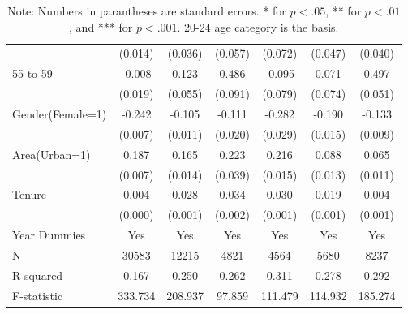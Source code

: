 \documentclass[12pt,author-year]{article}
\begin{document}
\begin{table}[H]
{{\begin{tabular}{l*{6}{c}}
&  (0.014)         &  (0.036)         &  (0.057)         &  (0.072)         &  (0.047)         &  (0.040)         \\
55 to 59            &   -0.008         &    0.123\sym{*}  &    0.486\sym{***}&   -0.095         &    0.071         &    0.497\sym{***}\\
&  (0.019)         &  (0.055)         &  (0.091)         &  (0.079)         &  (0.074)         &  (0.051)         \\
				Gender(Female=1)       &   -0.242\sym{***}&   -0.105\sym{***}&   -0.111\sym{***}&   -0.282\sym{***}&   -0.190\sym{***}&   -0.133\sym{***}\\
				&  (0.007)         &  (0.011)         &  (0.020)         &  (0.029)         &  (0.015)         &  (0.009)         \\
				Area(Urban=1)       &    0.187\sym{***}&    0.165\sym{***}&    0.223\sym{***}&    0.216\sym{***}&    0.088\sym{***}&    0.065\sym{***}\\
				&  (0.007)         &  (0.014)         &  (0.039)         &  (0.015)         &  (0.013)         &  (0.011)         \\
				Tenure            &    0.004\sym{***}&    0.028\sym{***}&    0.034\sym{***}&    0.030\sym{***}&    0.019\sym{***}&    0.004\sym{***}\\
				&  (0.000)         &  (0.001)         &  (0.002)         &  (0.001)         &  (0.001)         &  (0.001)         \\
				\midrule
Year Dummies        &      Yes         &      Yes         &      Yes         &      Yes         &      Yes         &      Yes         \\
N                   &  30583         &  12215         & 4821         & 4564        & 5680         & 8237         \\
R-squared               &    0.167         &    0.250         &    0.262         &    0.311         &    0.278         &    0.292         \\
F-statistic               &  333.734         &  208.937         &   97.859         &  111.479         &  114.932         &  185.274         \\
				\bottomrule
	\end{tabular}}}
		\caption*{{\scriptsize Note: Numbers in parantheses are standard errors. * for $p<.05$, ** for $p<.01$, and *** for $p<.001$. 20-24 age category is the basis.}}
\end{table}
\end{document}
